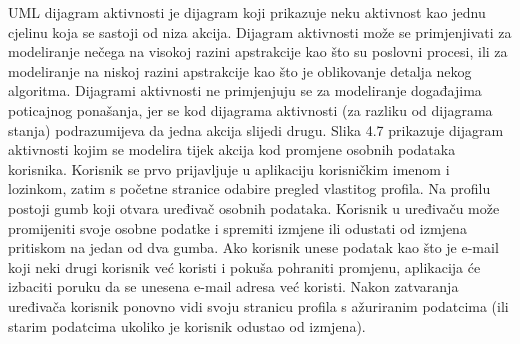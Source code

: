 			
		{UML dijagram aktivnosti je dijagram koji prikazuje neku aktivnost kao jednu cjelinu koja se sastoji od niza akcija. Dijagram aktivnosti može se primjenjivati za modeliranje nečega na visokoj razini apstrakcije kao što su poslovni procesi, ili za modeliranje na niskoj razini apstrakcije kao što je oblikovanje detalja nekog algoritma. Dijagrami aktivnosti ne primjenjuju se za modeliranje događajima poticajnog ponašanja, jer se kod dijagrama aktivnosti (za razliku od dijagrama stanja) podrazumijeva da jedna akcija slijedi drugu. Slika 4.7 prikazuje dijagram aktivnosti kojim se modelira tijek akcija kod promjene osobnih podataka korisnika. Korisnik se prvo prijavljuje u aplikaciju korisničkim imenom i lozinkom, zatim s početne stranice odabire pregled vlastitog profila. Na profilu postoji gumb koji otvara uređivač osobnih podataka. Korisnik u uređivaču može promijeniti svoje osobne podatke i spremiti izmjene ili odustati od izmjena pritiskom na jedan od dva gumba. Ako korisnik unese podatak kao što je e-mail koji neki drugi korisnik već koristi i pokuša pohraniti promjenu, aplikacija će izbaciti poruku da se unesena e-mail adresa već koristi. Nakon zatvaranja uređivača korisnik ponovno vidi svoju stranicu profila s ažuriranim podatcima (ili starim podatcima ukoliko je korisnik odustao od izmjena).}
			
